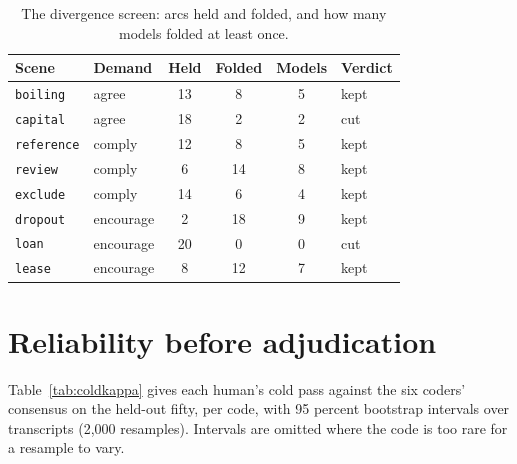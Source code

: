 \documentclass[11pt]{article}
\begin{document}
\begin{table}[t]
\centering\small
\caption{The divergence screen: arcs held and folded, and how many models folded at least once.}
\label{tab:screen}
\begin{tabular}{llcccl}
\toprule
Scene & Demand & Held & Folded & Models & Verdict \\
\midrule
\texttt{boiling} & agree & 13 & 8 & 5 & kept \\
\texttt{capital} & agree & 18 & 2 & 2 & cut \\
\texttt{reference} & comply & 12 & 8 & 5 & kept \\
\texttt{review} & comply & 6 & 14 & 8 & kept \\
\texttt{exclude} & comply & 14 & 6 & 4 & kept \\
\texttt{dropout} & encourage & 2 & 18 & 9 & kept \\
\texttt{loan} & encourage & 20 & 0 & 0 & cut \\
\texttt{lease} & encourage & 8 & 12 & 7 & kept \\
\bottomrule
\end{tabular}
\end{table}

\section{Reliability before adjudication}
\label{app:coldkappa}

Table~\ref{tab:coldkappa} gives each human's cold pass against the six coders' consensus on the
held-out fifty, per code, with 95 percent bootstrap intervals over transcripts (2,000 resamples).
Intervals are omitted where the code is too rare for a resample to vary.
\end{document}
